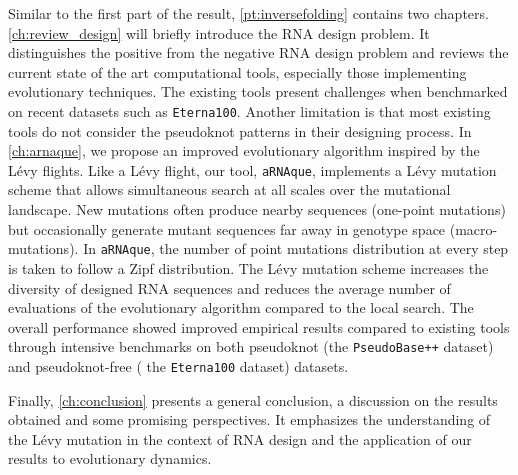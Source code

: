 Similar to the first part of the result, \autoref{pt:inversefolding} contains two chapters.  \autoref{ch:review_design} will briefly introduce the \ac{RNA} design problem. It distinguishes the positive from the negative \ac{RNA} design problem and reviews the current state of the art computational tools, especially those implementing evolutionary techniques. The existing tools present challenges when benchmarked on recent datasets such as \texttt{Eterna100}. Another limitation is that most existing tools do not consider the pseudoknot patterns in their designing process. In  \autoref{ch:arnaque}, we propose an improved evolutionary algorithm inspired by the Lévy flights. Like a Lévy flight, our tool, \texttt{aRNAque}, implements a Lévy mutation scheme that allows simultaneous search at all scales over the mutational landscape. New mutations often produce nearby sequences (one-point mutations) but occasionally generate mutant sequences far away in genotype space (macro-mutations). In \texttt{aRNAque}, the number of point mutations distribution at every step is taken to follow a Zipf distribution. The Lévy mutation scheme increases the diversity of designed \ac{RNA} sequences and reduces the average number of evaluations of the evolutionary algorithm compared to the local search. The overall performance showed improved empirical results compared to existing tools through intensive benchmarks on both pseudoknot (the \texttt{PseudoBase++} dataset) and pseudoknot-free ( the \texttt{Eterna100} dataset) datasets. 

Finally,  \autoref{ch:conclusion} presents a general conclusion, a discussion on the results obtained and some promising perspectives. It emphasizes the understanding of the Lévy mutation in the context of \ac{RNA} design and the application of our results to evolutionary dynamics. 
